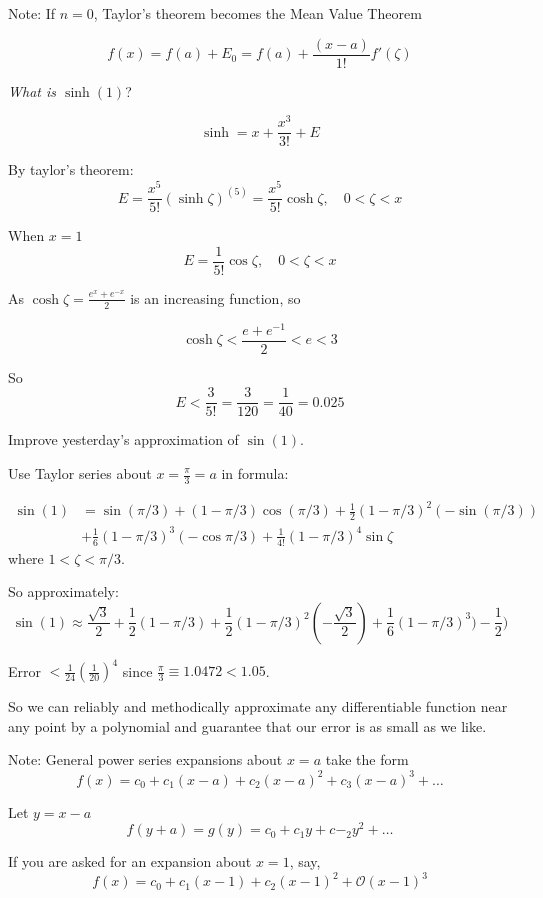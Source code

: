 \documentclass[twoside]{scrartcl}
\begin{document}
Note: If $n = 0$, Taylor's theorem becomes the Mean Value Theorem

\[f(x) = f(a) + E_0 = f(a) + \frac{(x-a)}{1!}f'(\zeta)\]

\begin{example}
\emph{What is $\sinh(1)$}?

\[\sinh = x + \frac{x^3}{3!} + E\]

By taylor's theorem:
\[E = \frac{x^5}{5!}(\sinh\zeta)^{(5)} = \frac{x^5}{5!}\cosh \zeta, \quad 0 < \zeta < x\]

When $x = 1$
\[E = \frac{1}{5!}\cos \zeta, \quad 0 < \zeta < x\]

As $\cosh\zeta = \frac{e^x + e^{-x}}{2}$ is an increasing function, so 

\[\cosh\zeta < \frac{e + e^{-1}}{2} < e < 3\]

So 
\[E < \frac{3}{5!} = \frac{3}{120} = \frac{1}{40} = 0.025\]
\end{example}\vspace*{10pt}


\begin{example}
Improve yesterday's approximation of $\sin(1)$. 

Use Taylor series about $x = \frac{\pi}{3} = a$ in formula: 

\[
\begin{aligned}
  \sin(1) &= \sin(\pi/3) + (1-\pi/3)\cos(\pi/3) + \frac{1}{2}(1-\pi/3)^2(-\sin(\pi/3))\\
   &+ \frac{1}{6}(1-\pi/3)^3(-\cos\pi/3) + \frac{1}{4!}(1-\pi/3)^4\sin\zeta
\end{aligned}
\]
where $1 < \zeta < \pi/3$. 

So approximately: 
\[\sin(1) \approx \frac{\sqrt{3}}{2} + \frac{1}{2}(1-\pi/3) + \frac{1}{2}(1-\pi/3)^2(-\frac{\sqrt{3}}{2}) + \frac{1}{6}(1-\pi/3)^3)-\frac{1}{2})\]

Error $< \frac{1}{24}(\frac{1}{20})^4$ since $\frac{\pi}{3} \equiv 1.0472 < 1.05$. 
\end{example}

So we can reliably and methodically approximate any differentiable function near any point by a polynomial and guarantee that our error is as small as we like. 

Note: General power series expansions about $x = a$ take the form
\[f(x) = c_0 + c_1(x-a) + c_2(x-a)^2 + c_3(x-a)^3 + \dots\]

Let $y = x-a$
\[f(y+a) = g(y) = c_0 + c_1y + c-_2y^2 + \dots\]

If you are asked for an expansion about $x=1$, say, 
\[f(x) = c_0 + c_1(x-1) + c_2(x-1)^2 + \mathcal{O}(x-1)^3\]
\end{document}
